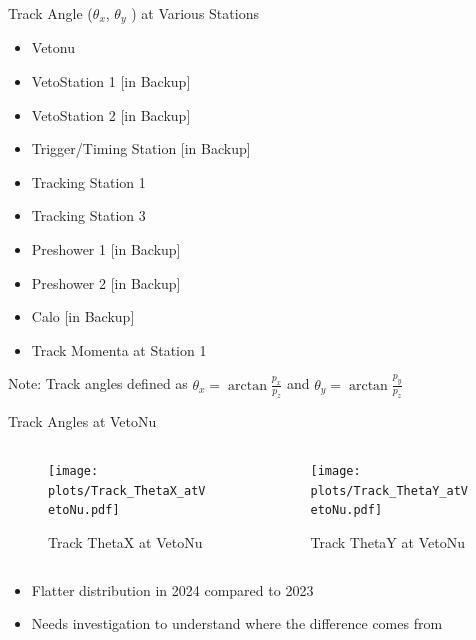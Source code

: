 \begin{frame}{Track Angle (\(\theta_x\), \(\theta_y \) ) at Various Stations}
	\begin{itemize}
		\item Vetonu
		\item VetoStation 1 [in Backup]
		\item VetoStation 2 [in Backup]
		\item Trigger/Timing Station [in Backup]
		\item Tracking Station 1
		\item Tracking Station 3
		\item Preshower 1 [in Backup]
		\item Preshower 2 [in Backup]
		\item Calo [in Backup]
		\item Track Momenta at Station 1
	\end{itemize}
	Note: Track angles defined as \( \theta_x = \arctan\frac{p_x}{p_z}\) and \( \theta_y = \arctan\frac{p_y}{p_z}\)
\end{frame}

\begin{frame}{Track Angles at VetoNu}
	\begin{columns}
		\begin{column}{0.5\textwidth}
			\begin{figure}
				\texttt{[image: \\plots/Track\_ThetaX\_atVetoNu.pdf]}
				\caption{Track ThetaX at VetoNu}
			\end{figure}
		\end{column}
		\begin{column}{0.5\textwidth}
			\begin{figure}
				\texttt{[image: \\plots/Track\_ThetaY\_atVetoNu.pdf]}
				\caption{Track ThetaY at VetoNu}
			\end{figure}
		\end{column}
	\end{columns}
	\begin{itemize}
		\item Flatter distribution in 2024 compared to 2023
		\item Needs investigation to understand where the difference comes from
	\end{itemize}
\end{frame}

